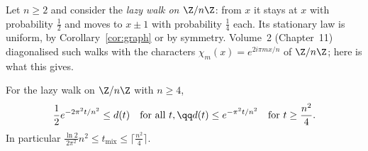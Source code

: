Let $n\ge2$ and consider the \emph{lazy walk on $\Z/n\Z$}: from $x$ it stays at $x$ with probability $\frac12$ and moves to $x\pm1$ with probability $\frac14$
each. Its stationary law is uniform, by Corollary~\ref{cor:graph} or by symmetry. Volume~2 (Chapter~11) diagonalised such walks with the
characters $\chi_m(x)=e^{2i\pi mx/n}$ of $\Z/n\Z$; here is what this gives.

\begin{theorem}\label{thm:cycle}
For the lazy walk on $\Z/n\Z$ with $n\ge4$,
\[
\begin{gathered}\frac12e^{-2\pi^2t/n^2}\le d(t)\quad\text{for all }t,\qq d(t)\le e^{-\pi^2t/n^2}\quad\text{for }t\ge\frac{n^2}4.\end{gathered}
\]
In particular $\frac{\ln2}{2\pi^2}n^2\le t_{\mathrm{mix}}\le\bigl\lceil\frac{n^2}4\bigr\rceil$.
\end{theorem}
